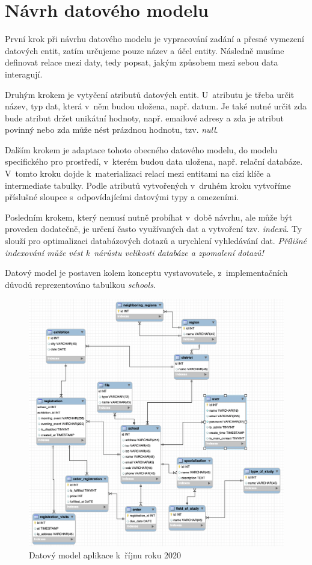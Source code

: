\section{Návrh datového modelu}
\label{sub:data-model}

První krok\cite{data-model} při návrhu datového modelu je vypracování zadání a přesné vymezení datových entit, zatím určujeme pouze název a účel entity.
Následně musíme definovat relace mezi daty, tedy popsat, jakým způsobem mezi sebou data interagují.

Druhým krokem je vytyčení atributů datových entit.
U~atributu je třeba určit název, typ dat, která v~něm budou uložena, např. datum.
Je také nutné určit zda bude atribut držet unikátní hodnoty, např. emailové adresy a zda je atribut povinný nebo zda může nést prázdnou hodnotu, tzv. \emph{null}\cite{null}.

Dalším krokem je adaptace tohoto obecného datového modelu, do modelu specifického pro prostředí, v~kterém budou data uložena, např. relační databáze.
V~tomto kroku dojde k~materializaci relací mezi entitami na cizí klíče a intermediate tabulky\cite{intermediate-table}.
Podle atributů vytvořených v~druhém kroku vytvoříme příslušné sloupce s~odpovídajícími datovými typy a omezeními. 

Posledním krokem, který nemusí nutně probíhat v~době návrhu, ale může být proveden dodatečně, je určení často využívaných dat a vytvoření tzv. \emph{indexů}\cite{index}.
Ty slouží pro optimalizaci databázových dotazů a urychlení vyhledávání dat.
\emph{Přílišné indexování může vést k~nárůstu velikosti databáze a zpomalení dotazů!}\cite{bad-indexing}

Datový model \bso{} je postaven kolem konceptu vystavovatele, z~implementačních důvodů reprezentováno tabulkou \emph{schools}.

\begin{figure}[H]
\centering
\includegraphics[width=\textwidth]{img/datovy-model-rijen-2020-3.png}
\caption{Datový model aplikace \bso{} k~říjnu roku 2020}
\label{fig:data-model-2020}
\end{figure}



